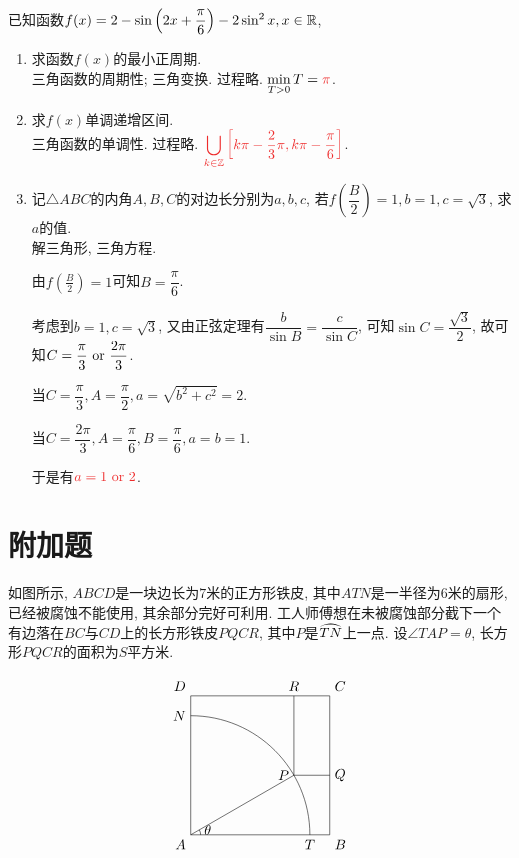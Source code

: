 \documentclass[8pt]{article}
\begin{document}
		已知函数$f(x)=2-\sin \left(2x+\dfrac{\pi}{6}\right)-2\sin^2 x, x\in \mathbb{R}$,

		\begin{enumerate}[label=(\arabic*)]
			\item 求函数$f(x)$的最小正周期.
				~\\

				三角函数的周期性; 三角变换. 过程略. $\displaystyle \min_{T>0}T=\ansmath{\pi}$.

			\item 求$f(x)$单调递增区间.
				~\\

				三角函数的单调性. 过程略. $\displaystyle\ansmath{\bigcup_{k\in\ZZ}\left[k\pi - \frac{2}{3}\pi, k\pi - \frac{\pi}{6}\right]}$.

			\item 记$\triangle ABC$的内角$A, B, C$的对边长分别为$a, b, c$, 若$f\left(\dfrac{B}{2}\right)=1, b=1, c=\sqrt{3}$, 求$a$的值.
				~\\

				解三角形, 三角方程.

				由$f\left(\frac{B}{2}\right)=1$可知$B=\dfrac{\pi}{6}$.

				考虑到$b=1, c=\sqrt{3}$, 又由正弦定理有$\dfrac{b}{\sin B}=\dfrac{c}{\sin C}$, 可知$\sin C=\dfrac{\sqrt{3}}{2}$, 故可知$C=\dfrac{\pi}{3} \text{ or } \dfrac{2\pi}{3}$.

				当$C=\dfrac{\pi}{3}, A=\dfrac{\pi}{2}, a=\sqrt{b^2+c^2}=2$.

				当$C=\dfrac{2\pi}{3}, A=\dfrac{\pi}{6}, B=\dfrac{\pi}{6}, a=b=1$.

				于是有$\ansmath{a=1 \lgor 2}$.
		\end{enumerate}

	\section{附加题}
		如图所示, $ABCD$是一块边长为$7$米的正方形铁皮, 其中$ATN$是一半径为$6$米的扇形, 已经被腐蚀不能使用, 其余部分完好可利用. 工人师傅想在未被腐蚀部分截下一个有边落在$BC$与$CD$上的长方形铁皮$PQCR$, 其中$P$是$\arc{TN}$上一点. 设$\angle TAP = \theta$, 长方形$PQCR$的面积为$S$平方米.
		
		$$
		\begin{tikzpicture}[scale=0.5, baseline=0]
    		\draw[black] (0, 0)--(7, 0)--(7, 7)--(0, 7)--(0, 0) node at (0, 0) [anchor=north east] {$A$} node at (7, 0) [anchor=north west] {$B$} node at (7, 7) [anchor=south west] {$C$} node at (0, 7) [anchor=south east] {$D$};
    		\draw[black] (6, 0) arc[start angle=0, end angle=90, radius=6] node at (6, 0) [anchor=north] {$T$} node at (0, 6) [anchor=east] {$N$};
    		\draw[black] (0.5, 0) arc[start angle=0, end angle=30, radius=0.5] node [right] {$\theta$};
    		\draw[black] (0, 0)--({3*sqrt(3)}, 3) node at ({3*sqrt(3)}, 3) [anchor=east]{$P$};
    		\draw[black] ({3*sqrt(3)}, 7)--({3*sqrt(3)}, 3)--(7, 3) node at ({3*sqrt(3)}, 7) [anchor=south] {$R$} node at (7, 3) [anchor=west] {$Q$};
    	\end{tikzpicture}
    	$$
\end{document}
